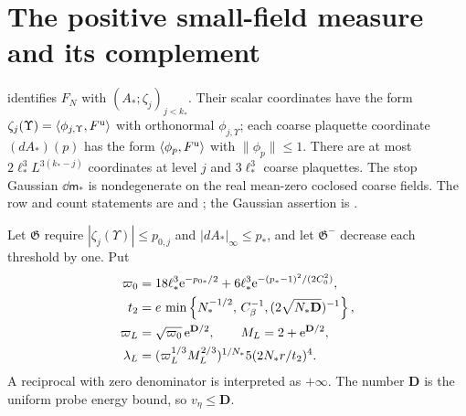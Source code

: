 \section{The positive small-field measure and its complement}
\label{subsec:interacting-complement}

\cite[Proposition~3.1]{TerminalPressure} identifies $F_N$
with $(A_*;\zeta_j)_{j<k_*}$. Their scalar
coordinates have the form
$\zeta_j(\Upsilon)=\langle\phi_{j,\Upsilon},F^{\rm u}\rangle$
with orthonormal $\phi_{j,\Upsilon}$; each
coarse plaquette coordinate $(dA_*)(p)$ has
the form $\langle\phi_p,F^{\rm u}\rangle$ with
$\|\phi_p\|\le1$.
There are at most $2\ell_*^3L^{3(k_*-j)}$
coordinates at level $j$ and $3\ell_*^3$
coarse plaquettes. The stop Gaussian
$\dd\mathsf m_*$ is nondegenerate on the
real mean-zero coclosed coarse fields.
The row and count statements are
\cite[(13)]{TerminalPressure} and
\cite[(14)]{TerminalPressure}; the
Gaussian assertion is \cite[(12)]{TerminalPressure}.

Let $\mathfrak G$ require
$|\zeta_j(\Upsilon)|\le p_{0,j}$
and $|dA_*|_\infty\le p_*$, and let
$\mathfrak G^-$ decrease each threshold by one.
Put
\begin{align}
 \varpi_0&=18\ell_*^3\mathrm e^{-p_{0*}/2}
               +6\ell_*^3\mathrm e^{-(p_*-1)^2/(2C_0^2)},\notag\\
 t_2&=e\,\min\left\{N_*^{-1/2},\,C_\beta^{-1},
                                     (2\sqrt{N_*\mathbf D})^{-1}\right\},\notag\\
 \varpi_L&=\sqrt{\varpi_0}\,\mathrm e^{\mathbf D/2},
 \qquad M_L=2+\mathrm e^{\mathbf D/2},\notag\\
 \lambda_L&=(\varpi_L^{1/3}M_L^{2/3})^{1/N_*}
                              5(2N_*r/t_2)^4 .
                                     \label{eq:interacting-complement-constants}
\end{align}
A reciprocal with zero denominator is interpreted
as $+\infty$. The number $\mathbf D$ is the
uniform probe energy bound, so $v_\eta\le\mathbf D$.

